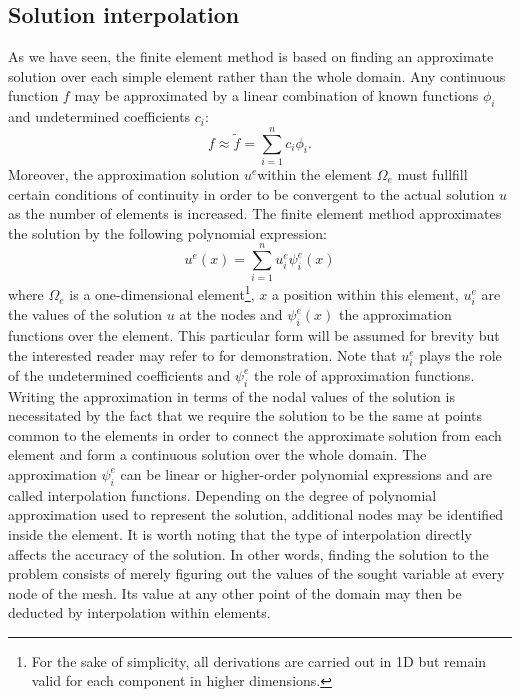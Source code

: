 	\subsection{Solution interpolation}	\label{chap3:solutionInterpolation}
As we have seen, the finite element method is based on finding an approximate solution over each simple element rather than the whole domain. Any continuous function $ f $ may be approximated by a linear combination of known functions $ \phi_i $ and undetermined coefficients $ c_i $:
\begin{equation}
f \approx \tilde{f} = \sum_{i=1}^n c_i \phi_i .
\end{equation}
Moreover, the approximation solution $ u^e $within the element $\Omega_e $ must fullfill certain conditions of continuity in order to be convergent to the actual solution $ u $ as the number of elements is increased. The finite element method approximates the solution by the following polynomial expression:
\begin{equation}
\label{chap3:polynom}
u^e(x) = \sum_{i=1}^n u^e_i \psi^e_i(x) 
\end{equation}
where $ \Omega_e $ is a one-dimensional element\footnote{For the sake of simplicity, all derivations are carried out in 1D but remain valid for each component in higher dimensions.}, $ x $ a position within this element, $ u^e_i $ are the values of the solution $ u $ at the nodes and $ \psi^e_i(x) $ the approximation functions over the element. This particular form will be assumed for brevity but the interested reader may refer to \cite{Reddy93} for demonstration. Note that $ u^e_i  $ plays the role of the undetermined coefficients and $ \psi^e_i $ the role of approximation functions. Writing the approximation in terms of the nodal values of the solution is necessitated by the fact that we require the solution to be the same at points common to the elements in order to connect the approximate solution from each element and form a continuous solution over the whole domain. The approximation $ \psi^e_i $ can be linear or higher-order polynomial expressions and are called interpolation functions. 
Depending on the degree of polynomial approximation used to represent the solution, additional nodes may be identified inside the element. It is worth noting that the type of interpolation directly affects the accuracy of the solution. In other words, finding the solution to the problem consists of merely figuring out the values of the sought variable at every node of the mesh. Its value at any other point of the domain may then be deducted by interpolation within elements. 

